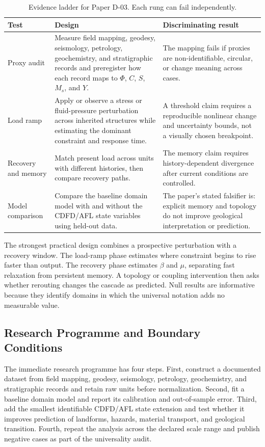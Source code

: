 \documentclass[11pt]{article}
\begin{document}
\begin{table}[htbp]
\centering
\small
\caption{Evidence ladder for Paper D-03. Each rung can fail independently.}
\begin{tabularx}{\textwidth}{|p{}|X|X|}
\hline
\textbf{Test} & \textbf{Design} & \textbf{Discriminating result} \\
\hline
Proxy audit & Measure field mapping, geodesy, seismology, petrology, geochemistry, and stratigraphic records and preregister how each record maps to $\Phi$, $C$, $S$, $M_s$, and $Y$. & The mapping fails if proxies are non-identifiable, circular, or change meaning across cases. \\
\hline
Load ramp & Apply or observe a stress or fluid-pressure perturbation across inherited structures while estimating the dominant constraint and response time. & A threshold claim requires a reproducible nonlinear change and uncertainty bounds, not a visually chosen breakpoint. \\
\hline
Recovery and memory & Match present load across units with different histories, then compare recovery paths. & The memory claim requires history-dependent divergence after current conditions are controlled. \\
\hline
Model comparison & Compare the baseline domain model with and without the CDFD/AFL state variables using held-out data. & The paper's stated falsifier is: explicit memory and topology do not improve geological interpretation or prediction. \\
\hline
\end{tabularx}
\end{table}

The strongest practical design combines a prospective perturbation with a
recovery window. The load-ramp phase estimates where constraint begins to rise
faster than output. The recovery phase estimates $\beta$ and $\mu$, separating
fast relaxation from persistent memory. A topology or coupling intervention
then asks whether rerouting changes the cascade as predicted. Null results are
informative because they identify domains in which the universal notation adds
no measurable value.

\subsection{Research Programme and Boundary Conditions}

The immediate research programme has four steps. First, construct a documented
dataset from field mapping, geodesy, seismology, petrology, geochemistry, and stratigraphic records and retain raw units before normalization.
Second, fit a baseline domain model and report its calibration and out-of-sample
error. Third, add the smallest identifiable CDFD/AFL state extension and test
whether it improves prediction of landforms, hazards, material transport, and geological transition. Fourth, repeat the
analysis across the declared scale range and publish negative cases as part of
the universality audit.
\end{document}
